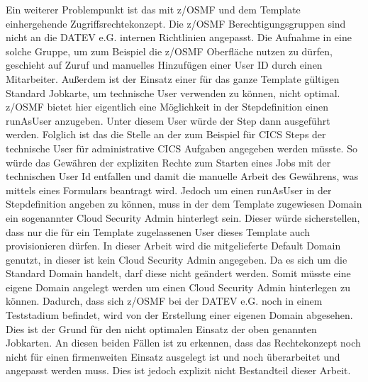 Ein weiterer Problempunkt ist das mit z/OSMF und dem Template einhergehende Zugriffsrechtekonzept.
Die z/OSMF Berechtigungsgruppen sind nicht an die DATEV e.G. internen Richtlinien angepasst.
Die Aufnahme in eine solche Gruppe, um zum Beispiel die z/OSMF Oberfläche nutzen zu dürfen, geschieht auf Zuruf und manuelles Hinzufügen einer User ID durch einen Mitarbeiter.
Außerdem ist der Einsatz einer für das ganze Template gültigen Standard Jobkarte, um technische User verwenden zu können, nicht optimal.
z/OSMF bietet hier eigentlich eine Möglichkeit in der Stepdefinition einen \glqq runAsUser\grqq{} anzugeben.
Unter diesem User würde der Step dann ausgeführt werden.
Folglich ist das die Stelle an der zum Beispiel für CICS Steps der technische User für administrative CICS Aufgaben angegeben werden müsste.
So würde das Gewähren der expliziten Rechte zum Starten eines Jobs mit der technischen User Id entfallen und damit die manuelle Arbeit des \glqq Gewährens\grqq, was mittels eines Formulars beantragt wird.
Jedoch um einen \glqq runAsUser\grqq{} in der Stepdefinition angeben zu können, muss in der dem Template zugewiesen \glqq Domain\grqq{} ein sogenannter \glqq Cloud Security Admin\grqq{} hinterlegt sein.
Dieser würde sicherstellen, dass nur die für ein Template zugelassenen User dieses Template auch provisionieren dürfen.
In dieser Arbeit wird die mitgelieferte \glqq Default Domain\grqq{} genutzt, in dieser ist kein \glqq Cloud Security Admin\grqq{} angegeben.
Da es sich um die Standard \glqq Domain\grqq{} handelt, darf diese nicht geändert werden.
Somit müsste eine eigene \glqq Domain\grqq{} angelegt werden um einen \glqq Cloud Security Admin\grqq{} hinterlegen zu können.
Dadurch, dass sich z/OSMF bei der DATEV e.G. noch in einem Teststadium befindet, wird von der Erstellung einer eigenen \glqq Domain\grqq{} abgesehen.
Dies ist der Grund für den nicht optimalen Einsatz der oben genannten Jobkarten.
An diesen beiden Fällen ist zu erkennen, dass das Rechtekonzept noch nicht für einen firmenweiten Einsatz ausgelegt ist und noch überarbeitet und angepasst werden muss.
Dies ist jedoch explizit nicht Bestandteil dieser Arbeit.


 
